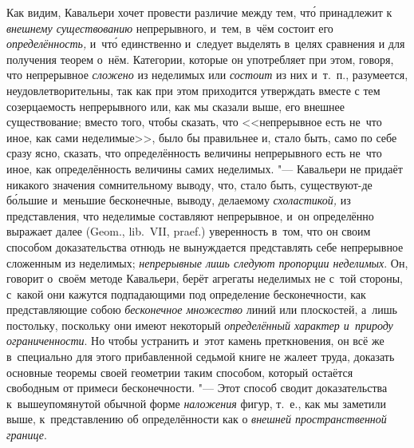 Как видим, Кавальери хочет провести различие между тем, чт\'{о} принадлежит к
{\em внешнему существованию} непрерывного, и~тем, в~чём состоит его
{\em определённость,} и~чт\'{о} единственно и~следует выделять в~целях сравнения и
для получения теорем о~нём. Категории, которые он употребляет при этом, говоря,
что непрерывное {\em сложено} из неделимых или {\em состоит} из них и~т.~п.,
разумеется, неудовлетворительны, так как при этом приходится утверждать вместе
с тем созерцаемость непрерывного или, как мы сказали выше, его внешнее
существование; вместо того, чтобы сказать, что <<непрерывное есть не~что иное,
как сами неделимые>>, было бы правильнее и, стало быть, само по себе сразу
ясно, сказать, что определённость величины непрерывного есть не~что иное, как
определённость величины самих неделимых. "--- Кавальери не придаёт никакого
значения сомнительному выводу, что, стало быть, существуют-де б\'{о}льшие и~меньшие
бесконечные, выводу, делаемому {\em схоластикой,} из представления, что неделимые
составляют непрерывное, и~он определённо выражает далее (Geom., lib.~VII,
praef.) уверенность в~том, что он своим способом доказательства отнюдь не
вынуждается представлять себе непрерывное сложенным из неделимых;
{\em непрерывные лишь следуют пропорции неделимых}. Он, говорит о~своём методе
Кавальери, берёт агрегаты неделимых не с~той стороны, с~какой они кажутся
подпадающими под определение бесконечности, как представляющие собою
{\em бесконечное множество} линий или плоскостей, а~лишь постольку, поскольку
они имеют некоторый {\em определённый характер и~природу ограниченности}. Но
чтобы устранить и~этот камень преткновения, он всё же в~специально для этого
прибавленной седьмой книге не жалеет труда, доказать основные теоремы своей
геометрии таким способом, который остаётся свободным от примеси бесконечности.
"--- Этот способ сводит доказательства к~вышеупомянутой обычной форме
{\em наложения} фигур, т.~е., как мы заметили выше, к~представлению об
определённости как о {\em внешней пространственной границе}.

